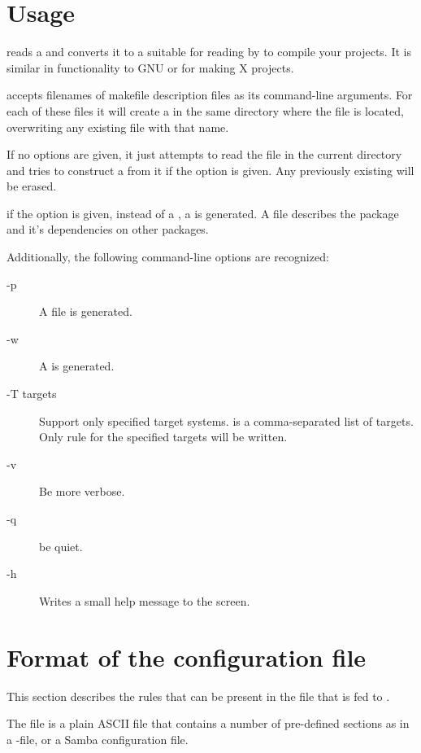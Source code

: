 {\section{Usage}
 reads a  and converts it to a
 suitable for reading by \gnu {}
to compile your projects. It is similar in functionality to GNU
 or  for making X projects.

\fpcmake{} accepts filenames of makefile description files
as its command-line arguments. For each of these files it will
create a  in the same directory where the file is
located, overwriting any existing file with that name.

If no options are given, it just attempts to read the file
 in the current directory and tries to
construct a  from it if the  option is
given. Any previously existing  will be erased.

if the  option is given, instead of a , a
 is generated. A  file describes the
package and it's dependencies on other packages.

Additionally, the following command-line options are recognized:
\begin{description}
\item[-p] A  file is generated.
\item[-w] A  is generated.
\item[-T targets] Support only specified target systems.  is a
comma-separated list of targets. Only rule for the specified targets
will be written.
\item[-v] Be more verbose.
\item[-q] be quiet.
\item[-h] Writes a small help message to the screen.
\end{description}

\section{Format of the configuration file}
This section describes the rules that can be present in the file
that is fed to \fpcmake{}.

The file  is a plain ASCII file that contains
a number of pre-defined sections as in a \windows {}-file,
or a Samba configuration file.

}
